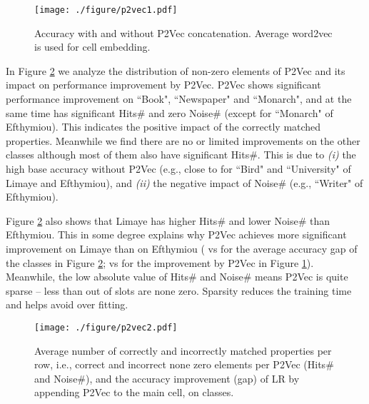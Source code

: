 \documentclass{article}
\begin{document}
\vspace{-0.18cm}
\begin{figure}[h]
\centering
\texttt{[image: ./figure/p2vec1.pdf]}
\vspace{-0.6cm}
\caption{\footnotesize
Accuracy with and without P2Vec concatenation.
Average word2vec is used for cell embedding.
}
\label{res:p2vec1}
\end{figure}
\vspace{-0.17cm}

In Figure \ref{res:p2vec2} we analyze the distribution of non-zero elements of P2Vec 
and its impact on performance improvement by P2Vec.
P2Vec shows significant performance improvement on ``Book", ``Newspaper" and ``Monarch",
and at the same time has significant Hits\# and zero Noise\# (except for ``Monarch" of Efthymiou). 
This indicates the positive impact of the correctly matched properties.
Meanwhile we find there are no or limited improvements on the other  classes although most of them also have significant Hits\#.
This is due to
\textit{(i)} the high base accuracy without P2Vec 
(e.g., close to  for ``Bird" and ``University" of Limaye and Efthymiou), 
and \textit{(ii)} the negative impact of Noise\# 
(e.g., ``Writer" of Efthymiou). 

Figure \ref{res:p2vec2} also shows that 
Limaye has higher Hits\# 
and lower Noise\# 
than Efthymiou.
This in some degree explains why P2Vec achieves more significant improvement on Limaye than on Efthymiou 
( vs  for the average accuracy gap of the  classes in Figure \ref{res:p2vec2}; 
 vs  for the improvement by P2Vec in Figure \ref{res:p2vec1}).
Meanwhile, the low absolute value of Hits\# and Noise\# means P2Vec is quite sparse -- 
less than  out of  slots are none zero.
Sparsity reduces the training time and helps avoid over fitting.

\vspace{-0.15cm}
\begin{figure}[h]
\centering
\texttt{[image: ./figure/p2vec2.pdf]}
\vspace{-0.68cm}
\caption{\footnotesize
Average number of correctly and incorrectly matched properties per row, i.e., correct and incorrect none zero elements per P2Vec (Hits\# and Noise\#),
and the accuracy improvement (gap) of LR by appending P2Vec to the main cell,
on  classes.
}
\label{res:p2vec2}
\end{figure}
\vspace{-0.2cm}
\end{document}
